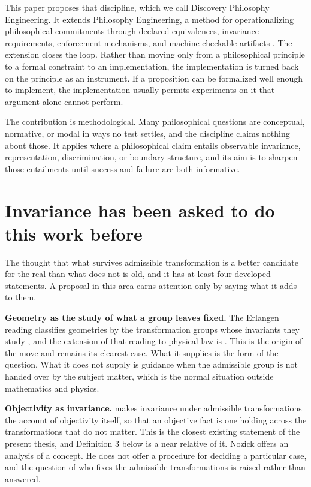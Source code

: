 \documentclass[11pt]{article}
\theoremstyle{remark}
\begin{document}
This paper proposes that discipline, which we call Discovery Philosophy
Engineering. It extends Philosophy Engineering, a method for operationalizing
philosophical commitments through declared equivalences, invariance requirements,
enforcement mechanisms, and machine-checkable artifacts \citep{bond2026pe}. The
extension closes the loop. Rather than moving only from a philosophical principle
to a formal constraint to an implementation, the implementation is turned back on
the principle as an instrument. If a proposition can be formalized well enough to
implement, the implementation usually permits experiments on it that argument alone
cannot perform.

The contribution is methodological. Many philosophical questions are conceptual,
normative, or modal in ways no test settles, and the discipline claims nothing
about those. It applies where a philosophical claim entails observable invariance,
representation, discrimination, or boundary structure, and its aim is to sharpen
those entailments until success and failure are both informative.

\section{Invariance has been asked to do this work before}

The thought that what survives admissible transformation is a better candidate for
the real than what does not is old, and it has at least four developed statements.
A proposal in this area earns attention only by saying what it adds to them.

\textbf{Geometry as the study of what a group leaves fixed.} The Erlangen reading
classifies geometries by the transformation groups whose invariants they study
\citep{klein1893}, and the extension of that reading to physical law is
\citet{weyl1952}. This is the origin of the move and remains its clearest case.
What it supplies is the form of the question. What it does not supply is guidance
when the admissible group is not handed over by the subject matter, which is the
normal situation outside mathematics and physics.

\textbf{Objectivity as invariance.} \citet{nozick2001} makes invariance under
admissible transformations the account of objectivity itself, so that an objective
fact is one holding across the transformations that do not matter. This is the
closest existing statement of the present thesis, and Definition 3 below is a near
relative of it. Nozick offers an analysis of a concept. He does not offer a
procedure for deciding a particular case, and the question of who fixes the
admissible transformations is raised rather than answered.
\end{document}
